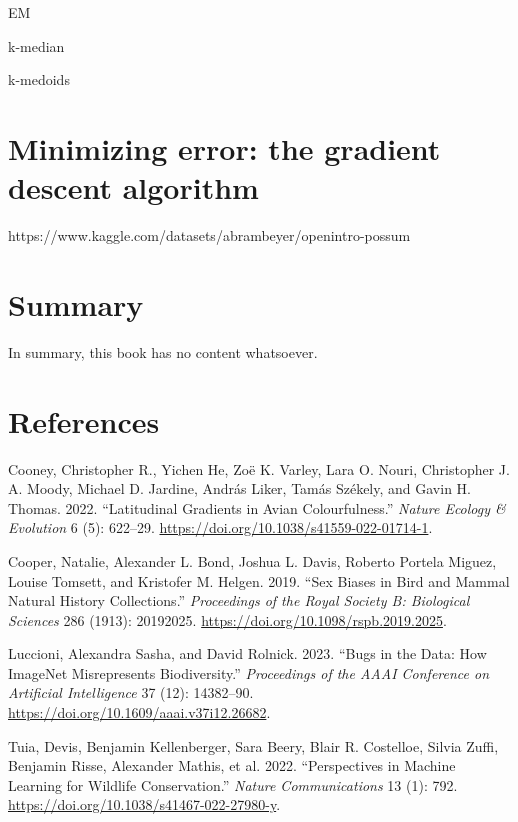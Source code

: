 \documentclass[
  letterpaper,
]{scrbook}
\newlength{\cslhangindent}
\newlength{\cslentryspacingunit} %
\newenvironment{CSLReferences}[2] %
 {%
  \setlength{\parindent}{0pt}
  \ifodd #1
  \let\oldpar\par
  \def\par{\hangindent=\cslhangindent\oldpar}
  \fi
  \setlength{\parskip}{#2\cslentryspacingunit}
 }%
 {}
\begin{document}
EM

k-median

k-medoids


\hypertarget{minimizing-error-the-gradient-descent-algorithm}{%
\chapter{Minimizing error: the gradient descent
algorithm}\label{minimizing-error-the-gradient-descent-algorithm}}

https://www.kaggle.com/datasets/abrambeyer/openintro-possum


\hypertarget{summary}{%
\chapter{Summary}\label{summary}}

In summary, this book has no content whatsoever.


\hypertarget{references}{%
\chapter*{References}\label{references}}


\hypertarget{refs}{}
\begin{CSLReferences}{1}{0}
\leavevmode{}%
Cooney, Christopher R., Yichen He, Zoë K. Varley, Lara O. Nouri,
Christopher J. A. Moody, Michael D. Jardine, András Liker, Tamás
Székely, and Gavin H. Thomas. 2022. {``Latitudinal Gradients in Avian
Colourfulness.''} \emph{Nature Ecology \& Evolution} 6 (5): 622--29.
\url{https://doi.org/10.1038/s41559-022-01714-1}.

\leavevmode{}%
Cooper, Natalie, Alexander L. Bond, Joshua L. Davis, Roberto Portela
Miguez, Louise Tomsett, and Kristofer M. Helgen. 2019. {``Sex Biases in
Bird and Mammal Natural History Collections.''} \emph{Proceedings of the
Royal Society B: Biological Sciences} 286 (1913): 20192025.
\url{https://doi.org/10.1098/rspb.2019.2025}.

\leavevmode{}%
Luccioni, Alexandra Sasha, and David Rolnick. 2023. {``Bugs in the Data:
How ImageNet Misrepresents Biodiversity.''} \emph{Proceedings of the
AAAI Conference on Artificial Intelligence} 37 (12): 14382--90.
\url{https://doi.org/10.1609/aaai.v37i12.26682}.

\leavevmode{}%
Tuia, Devis, Benjamin Kellenberger, Sara Beery, Blair R. Costelloe,
Silvia Zuffi, Benjamin Risse, Alexander Mathis, et al. 2022.
{``Perspectives in Machine Learning for Wildlife Conservation.''}
\emph{Nature Communications} 13 (1): 792.
\url{https://doi.org/10.1038/s41467-022-27980-y}.

\end{CSLReferences}


\backmatter
\end{document}
